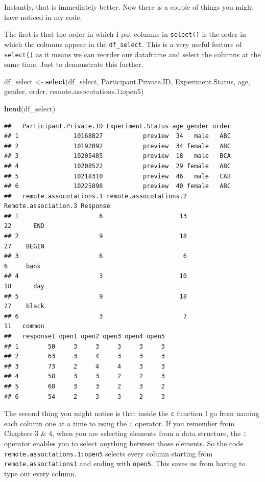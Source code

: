 \documentclass[
]{book}
\newenvironment{Shaded}{\begin{snugshade}}{\end{snugshade}}
\newcommand{\FloatTok}[1]{\textcolor[rgb]{0.00,0.00,0.81}{#1}}
\newcommand{\FunctionTok}[1]{\textcolor[rgb]{0.13,0.29,0.53}{\textbf{#1}}}
\newcommand{\NormalTok}[1]{#1}
\newcommand{\OtherTok}[1]{\textcolor[rgb]{0.56,0.35,0.01}{#1}}
\newcommand{\SpecialCharTok}[1]{\textcolor[rgb]{0.81,0.36,0.00}{\textbf{#1}}}
\begin{document}
Instantly, that is immediately better. Now there is a couple of things you might have noticed in my code.

The first is that the order in which I put columns in \texttt{select()} is the order in which the columns appear in the \texttt{df\_select}. This is a very useful feature of \texttt{select()} as it means we can reorder our dataframe and select the columns at the same time. Just to demonstrate this further.

\begin{Shaded}
\begin{Highlighting}[]
\NormalTok{df\_select }\OtherTok{\textless{}{-}} \FunctionTok{select}\NormalTok{(df\_select, Participant.Private.ID, Experiment.Status, age, gender, order, remote.assocotations}\FloatTok{.1}\SpecialCharTok{:}\NormalTok{open5)}

\FunctionTok{head}\NormalTok{(df\_select)}
\end{Highlighting}
\end{Shaded}

\begin{verbatim}
##   Participant.Private.ID Experiment.Status age gender order
## 1               10168827           preview  34   male   ABC
## 2               10192092           preview  34 female   ABC
## 3               10205485           preview  18   male   BCA
## 4               10208522           preview  29 female   ABC
## 5               10218310           preview  46   male   CAB
## 6               10225898           preview  40 female   ABC
##   remote.assocotations.1 remote.assocotations.2 Remote.association.3 Response
## 1                      6                     13                   22      END
## 2                      9                     18                   27    BEGIN
## 3                      6                      6                    6     bank
## 4                      3                     10                   18      day
## 5                      9                     18                   27    black
## 6                      3                      7                   11   common
##   response1 open1 open2 open3 open4 open5
## 1        50     3     3     3     3     3
## 2        63     3     4     3     3     3
## 3        73     2     4     4     3     3
## 4        58     3     3     2     2     3
## 5        68     3     3     2     3     2
## 6        54     2     3     3     2     3
\end{verbatim}

The second thing you might notice is that inside the \texttt{c} function I go from naming each column one at a time to using the \texttt{:} operator. If you remember from Chapters 3 \& 4, when you are selecting elements from a data structure, the \texttt{:} operator enables you to select anything between those elements. So the code \texttt{remote.assoctations.1:open5} selects every column starting from \texttt{remote.assoctations1} and ending with \texttt{open5}. This saves us from having to type out every column.
\end{document}
